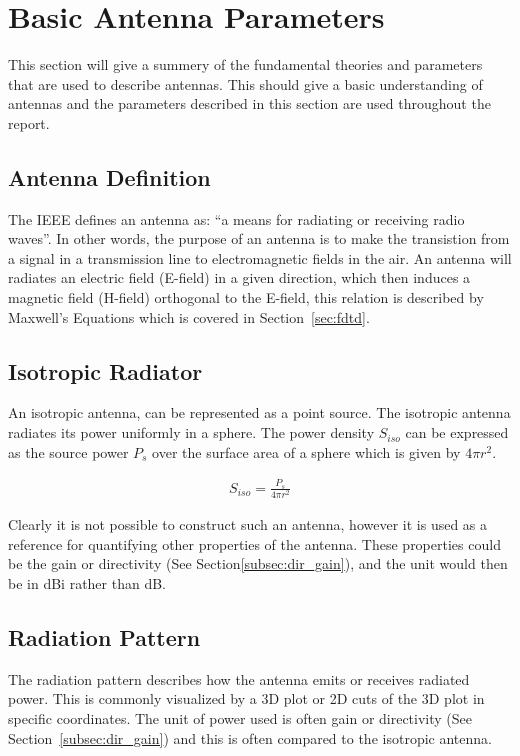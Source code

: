 \section{Basic Antenna Parameters}
This section will give a summery of the fundamental theories and parameters that are used to describe antennas. This should give a basic understanding of antennas and the parameters described in this section are used throughout the report. 

\subsection{Antenna Definition}
\label{subsec:antenna-def}
The IEEE defines an antenna as: ``a means for radiating or receiving radio waves''. In other words, the purpose of an antenna is to make the transistion from a signal in a transmission line to electromagnetic fields in the air. An antenna will radiates an electric field (E-field) in a given direction, which then induces a magnetic field (H-field) orthogonal to the E-field, this relation is described by Maxwell's Equations which is covered in Section~\ref{sec:fdtd}. \cite{}

\subsection{Isotropic Radiator}
\label{subsec:isotropic-ant}
An isotropic antenna, can be represented as a point source. The isotropic antenna radiates its power uniformly in a sphere. The power density $S_{iso}$ can be expressed as the source power $P_s$ over the surface area of a sphere which is given by $4\pi r^2$. \cite{} 

\begin{align}
  S_{iso} = \frac{P_s}{4\pi r^2}
\end{align}

Clearly it is not possible to construct such an antenna, however it is used as a reference for quantifying other properties of the antenna. These properties could be the gain or directivity (See Section\ref{subsec:dir_gain}), and the unit would then be in \si{dBi} rather than \si{dB}.

\subsection{Radiation Pattern}
\label{subsec:radiation-p}
The radiation pattern describes how the antenna emits or receives radiated power. This is commonly visualized by a 3D plot or 2D cuts of the 3D plot in specific coordinates. The unit of power used is often gain or directivity (See Section~\ref{subsec:dir_gain}) and this is often compared to the isotropic antenna. \cite{}

